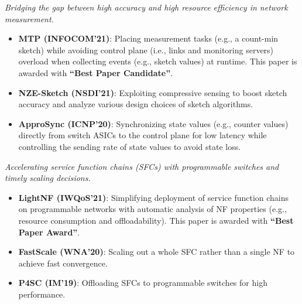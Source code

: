 \documentclass{resume}
\begin{document}
\emph{Bridging the gap between high accuracy and high resource efficiency in network measurement.}
\begin{itemize}
  \item \textbf{MTP (INFOCOM'21)}: Placing measurement tasks (e.g., a count-min sketch) while avoiding control plane (i.e., links and monitoring servers) overload when collecting events (e.g., sketch values) at runtime. This paper is awarded with \textbf{``Best Paper Candidate''}. 
  \item \textbf{NZE-Sketch (NSDI'21)}: Exploiting compressive sensing to boost sketch accuracy and analyze various design choices of sketch algorithms. 
  \item \textbf{ApproSync (ICNP'20)}: Synchronizing state values (e.g., counter values) directly from switch ASICs to the control plane for low latency while controlling the sending rate of state values to avoid state loss.
\end{itemize}

\emph{Accelerating service function chains (SFCs) with programmable switches and timely scaling decisions.}
\begin{itemize}
  \item \textbf{LightNF (IWQoS'21)}: Simplifying deployment of service function chains on programmable networks with automatic analysis of NF properties (e.g., resource consumption and offloadability). This paper is awarded with \textbf{``Best Paper Award''}. 
  \item \textbf{FastScale (WNA'20)}: Scaling out a whole SFC rather than a single NF to achieve fast convergence. 
  \item \textbf{P4SC (IM'19)}: Offloading SFCs to programmable switches for high performance.
\end{itemize}

\end{document}
